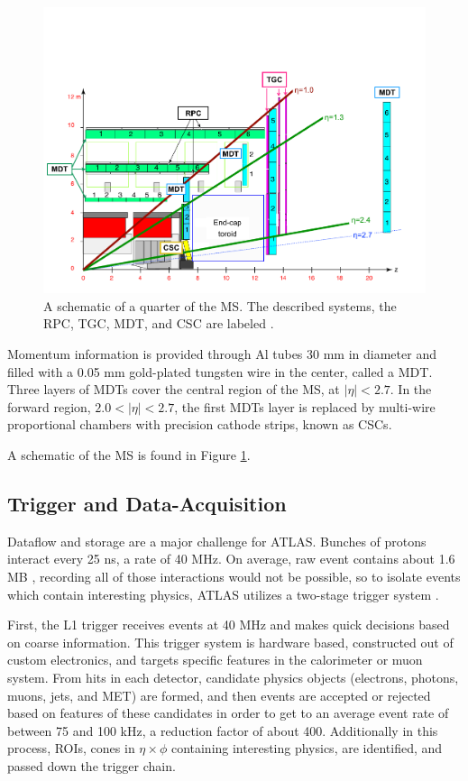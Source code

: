 \begin{figure}[!ht]
    \centering
    \includegraphics[width=.9\textwidth]{chapters/chapter2_experiment/images/muon_detector.png}
    \caption{A schematic of a quarter of the \gls{MS}. The described systems, the \gls{RPC}, \gls{TGC}, \gls{MDT}, and \gls{CSC} are labeled \cite{muon-performance2015}.}
    \label{fig:muon-schematic}
\end{figure}


Momentum information is provided through Al tubes 30 mm in diameter and filled with a 0.05 mm gold-plated tungsten wire in the center, called a \gls{MDT}. Three layers of \glspl{MDT} cover the central region of the \gls{MS}, at $|\eta| < 2.7$. In the forward region, $2.0<|\eta|<2.7$, the first \glspl{MDT} layer is replaced by multi-wire proportional chambers with precision cathode strips, known as \glspl{CSC}.

A schematic of the \gls{MS} is found in Figure \ref{fig:muon-schematic}.

\subsection{Trigger and Data-Acquisition} \label{ssec:tdaq}

Dataflow and storage are a major challenge for ATLAS. Bunches of protons interact every 25 ns, a rate of 40 MHz. On average, raw event contains about 1.6 MB \cite{ATLASfact-sheet}, recording all of those interactions would not be possible, so to isolate events which contain interesting physics, ATLAS utilizes a two-stage trigger system \cite{trigger2010}.

First, the \gls{L1} trigger receives events at 40 MHz and makes quick decisions based on coarse information. This trigger system is hardware based, constructed out of custom electronics, and targets specific features in the calorimeter or muon system. From hits in each detector, candidate physics objects (electrons, photons, muons, jets, and \gls{MET}) are formed, and then events are accepted or rejected based on features of these candidates in order to get to an average event rate of between 75 and 100 kHz, a reduction factor of about 400. Additionally in this process, \glspl{ROI}, cones in $\eta \times \phi$ containing interesting physics, are identified, and passed down the trigger chain.

